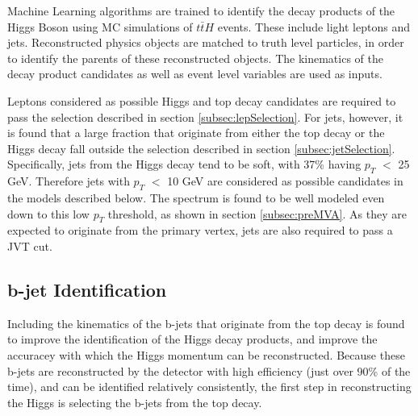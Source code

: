 Machine Learning algorithms are trained to identify the decay products of the Higgs Boson using MC simulations of $t\bar{t}H$ events. These include light leptons and jets. Reconstructed physics objects are matched to truth level particles, in order to identify the parents of these reconstructed objects. The kinematics of the decay product candidates as well as event level variables are used as inputs. 


Leptons considered as possible Higgs and top decay candidates are required to pass the selection described in section \ref{subsec:lepSelection}. For jets, however, it is found that a large fraction that originate from either the top decay or the Higgs decay fall outside the selection described in section \ref{subsec:jetSelection}. Specifically, jets from the Higgs decay tend to be soft, with 37\% having $p_T$ $<$ 25 GeV. Therefore jets with $p_T$ $<$ 10 GeV are considered as possible candidates in the models described below. The spectrum is found to be well modeled even down to this low $p_T$ threshold, as shown in section \ref{subsec:preMVA}. As they are expected to originate from the primary vertex, jets are also required to pass a JVT cut.

\subsection{b-jet Identification}
\label{sec:bjetID}

Including the kinematics of the b-jets that originate from the top decay is found to improve the identification of the Higgs decay products, and improve the accuracey with which the Higgs momentum can be reconstructed. Because these b-jets are reconstructed by the detector with high efficiency (just over 90\% of the time), and can be identified relatively consistently, the first step in reconstructing the Higgs is selecting the b-jets from the top decay.

